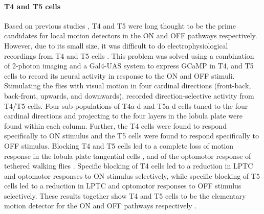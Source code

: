 \paragraph{T4 and T5 cells}
Based on previous studies \parencite{Fischbach1989, Buchner1984}, T4 and T5 were long thought to be the prime candidates for local motion detectors in the ON and OFF pathways respectively. However, due to its small size, it was difficult to do electrophysiological recordings from T4 and T5 cells \parencite{Douglass1996}. This problem was solved using a combination of 2-photon imaging and a Gal4-UAS system to express GCaMP in T4, and T5 cells to record its neural activity in response to the ON and OFF stimuli. Stimulating the flies with visual motion in four cardinal directions (front-back, back-front, upwards, and downwards), \cite{Maisak2013} recorded direction-selective activity from T4/T5 cells. Four sub-populations of T4a-d and T5a-d cells tuned to the four cardinal directions and projecting to the four layers in the lobula plate were found within each column. Further, the T4 cells were found to respond specifically to ON stimulus and the T5 cells were found to respond specifically to OFF stimulus. Blocking T4 and T5 cells led to a complete loss of motion response in the lobula plate tangential cells \parencite{Schnell2012}, and of the optomotor response of tethered walking flies \parencite{Bahl2013}. Specific blocking of T4 cells led to a reduction in LPTC and optomotor responses to ON stimulus selectively, while specific blocking of T5 cells led to a reduction in LPTC and optomotor responses to OFF stimulus selectively. These results together show T4 and T5 cells to be the elementary motion detector for the ON and OFF pathways respectively \parencite{Maisak2013}.      

